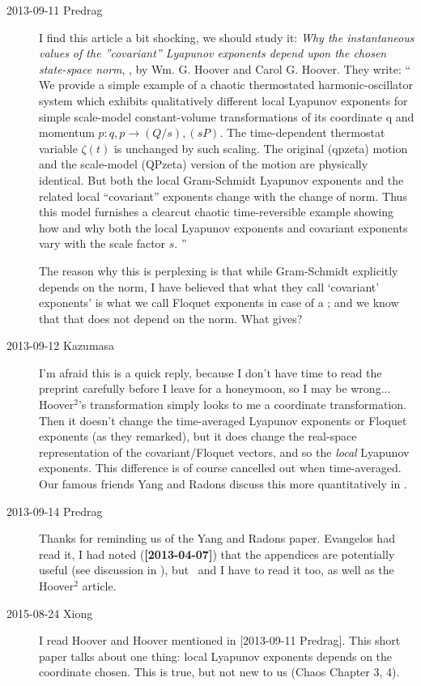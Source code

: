 \begin{description}
\item[2013-09-11 Predrag]
I find this article a bit shocking, we should study it:
{\em Why the instantaneous values of the ''{covariant}'' {Lyapunov}
    exponents depend upon the chosen state-space norm},
,
by Wm. G. Hoover and Carol G. Hoover. They write:
``
  We provide a simple example of a chaotic thermostated harmonic-oscillator
system which exhibits qualitatively different local Lyapunov exponents for
simple scale-model constant-volume transformations of its coordinate q and
momentum $p : {q,p} \to {(Q/s),(sP)}$. The time-dependent thermostat variable
$\zeta(t)$ is unchanged by such scaling. The original (qpzeta) motion and the
scale-model (QPzeta) version of the motion are physically identical. But both
the local Gram-Schmidt Lyapunov exponents and the related local ``covariant''
exponents change with the change of norm. Thus this model furnishes a clearcut
chaotic time-reversible example showing how and why both the local Lyapunov
exponents and covariant exponents vary with the scale factor $s$.
''

The reason why this is perplexing is that while Gram-Schmidt
explicitly depends on the norm, I have believed that what they call
`covariant' exponents' is what we call Floquet exponents in case of a
\po; and we know that that does not depend on the norm. What gives?

\item[2013-09-12 Kazumasa]
I'm afraid this is a quick reply,
 because I don't have time to read the preprint carefully
 before I leave for a honeymoon, so I may be wrong...
Hoover$^2$'s transformation simply looks to me a coordinate transformation.
Then it doesn't change
 the time-averaged Lyapunov exponents or Floquet exponents (as they remarked),
 but it does change the real-space representation
 of the covariant/Floquet vectors,
 and so the \textit{local} Lyapunov exponents.
This difference is of course cancelled out when time-averaged.
Our famous friends Yang and Radons discuss this more quantitatively
 in .

\item[2013-09-14 Predrag]
Thanks for reminding us of the Yang and Radons paper. Evangelos had
read it, I had noted ({\bf [2013-04-07]}) that the appendices are
potentially useful (see discussion in ),
but \XD\ and I have to read it too, as well as the Hoover${}^2$
article.

\item[2015-08-24 Xiong]
I read  Hoover and Hoover mentioned in [2013-09-11 Predrag].
This short paper talks about one thing: local Lyapunov
exponents depends on the coordinate chosen.
This is true, but not new to us (Chaos Chapter 3, 4).


\end{description}
